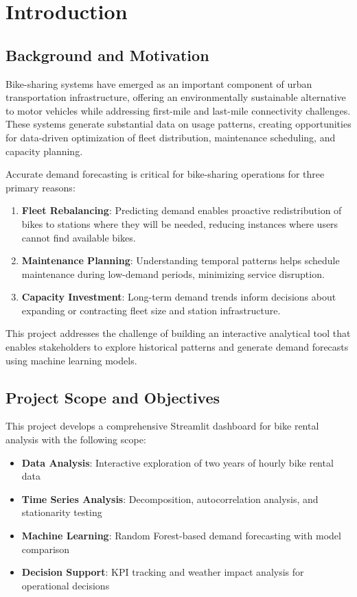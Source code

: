 \documentclass[12pt,a4paper]{article}
\begin{document}
\newpage

\section{Introduction}

\subsection{Background and Motivation}

Bike-sharing systems have emerged as an important component of urban transportation infrastructure, offering an environmentally sustainable alternative to motor vehicles while addressing first-mile and last-mile connectivity challenges. These systems generate substantial data on usage patterns, creating opportunities for data-driven optimization of fleet distribution, maintenance scheduling, and capacity planning.

Accurate demand forecasting is critical for bike-sharing operations for three primary reasons:

\begin{enumerate}
    \item \textbf{Fleet Rebalancing}: Predicting demand enables proactive redistribution of bikes to stations where they will be needed, reducing instances where users cannot find available bikes.
    \item \textbf{Maintenance Planning}: Understanding temporal patterns helps schedule maintenance during low-demand periods, minimizing service disruption.
    \item \textbf{Capacity Investment}: Long-term demand trends inform decisions about expanding or contracting fleet size and station infrastructure.
\end{enumerate}

This project addresses the challenge of building an interactive analytical tool that enables stakeholders to explore historical patterns and generate demand forecasts using machine learning models.

\subsection{Project Scope and Objectives}

This project develops a comprehensive Streamlit dashboard for bike rental analysis with the following scope:

\begin{itemize}
    \item \textbf{Data Analysis}: Interactive exploration of two years of hourly bike rental data
    \item \textbf{Time Series Analysis}: Decomposition, autocorrelation analysis, and stationarity testing
    \item \textbf{Machine Learning}: Random Forest-based demand forecasting with model comparison
    \item \textbf{Decision Support}: KPI tracking and weather impact analysis for operational decisions
\end{itemize}
\end{document}
